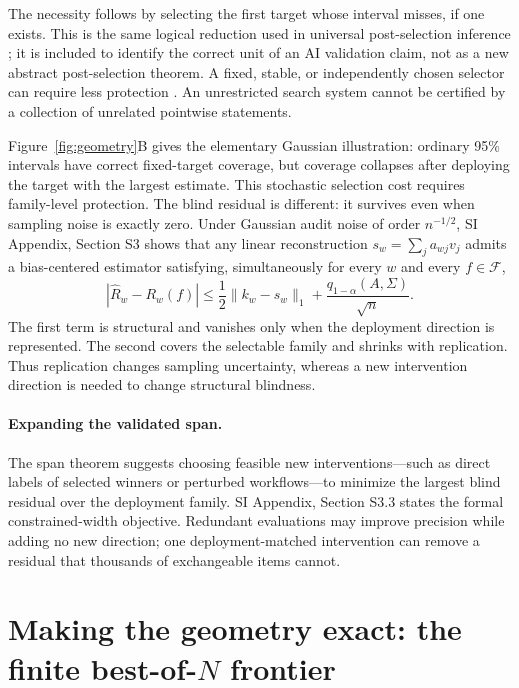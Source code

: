 \documentclass[10pt,twocolumn]{article}
\newcommand{\cF}{\mathcal F}
\begin{document}
The necessity follows by selecting the first target whose interval misses, if one exists. This is the same logical reduction used in universal post-selection inference \citep{berk2013}; it is included to identify the correct unit of an AI validation claim, not as a new abstract post-selection theorem. A fixed, stable, or independently chosen selector can require less protection \citep{hubbard2016,zrnic2023}. An unrestricted search system cannot be certified by a collection of unrelated pointwise statements.

Figure~\ref{fig:geometry}B gives the elementary Gaussian illustration: ordinary 95\% intervals have correct fixed-target coverage, but coverage collapses after deploying the target with the largest estimate. This stochastic selection cost requires family-level protection. The blind residual is different: it survives even when sampling noise is exactly zero. Under Gaussian audit noise of order $n^{-1/2}$, SI Appendix, Section S3 shows that any linear reconstruction $s_w=\sum_ja_{wj}v_j$ admits a bias-centered estimator satisfying, simultaneously for every $w$ and every $f\in\cF$,
\begin{equation}
|\widehat R_w-R_w(f)|
\le \frac12\|k_w-s_w\|_1+\frac{q_{1-\alpha}(A,\Sigma)}{\sqrt n}.
\label{eq:capacityband}
\end{equation}
The first term is structural and vanishes only when the deployment direction is represented. The second covers the selectable family and shrinks with replication. Thus replication changes sampling uncertainty, whereas a new intervention direction is needed to change structural blindness.

\paragraph{Expanding the validated span.}
The span theorem suggests choosing feasible new interventions---such as direct labels of selected winners or perturbed workflows---to minimize the largest blind residual over the deployment family. SI Appendix, Section S3.3 states the formal constrained-width objective. Redundant evaluations may improve precision while adding no new direction; one deployment-matched intervention can remove a residual that thousands of exchangeable items cannot.

\section*{Making the geometry exact: the finite best-of-$N$ frontier}
\end{document}
